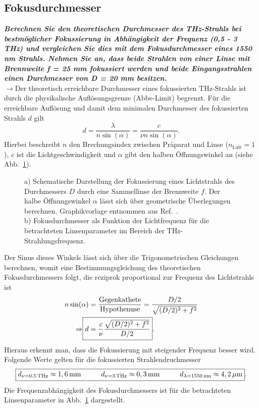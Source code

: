 \subsection{\label{subsec:FZV3}Fokusdurchmesser}
\textbf{\textit{Berechnen Sie den theoretischen Durchmesser des THz-Strahls bei bestmöglicher
Fokussierung in Abhängigkeit der Frequenz (0,5 - 3 THz) und vergleichen Sie dies
mit dem Fokusdurchmesser eines 1550 nm Strahls. Nehmen Sie an, dass beide
Strahlen von einer Linse mit Brennweite f = 25 mm fokussiert werden und beide
Eingangsstrahlen einen Durchmesser von D = 20 mm besitzen.}}\\
$\rightarrow$Der theoretisch erreichbare Durchmesser eines fokussierten THz-Strahls ist durch 
die physikalische Auflösungsgrenze (Abbe-Limit) begrenzt. Für die erreichbare 
Auflösung und damit dem minimalen Durchmesser des fokussierten Strahls $d$ gilt
\begin{equation}
    d = \frac{\lambda}{n\sin(\alpha)} = \frac{c}{\nu n\sin(\alpha)}.
\end{equation} 
Hierbei beschreibt $n$ den Brechungsindex zwischen Präparat und Linse ($n_{\text{Luft}}=1$), $c$ ist die Lichtgeschwindigkeit und 
$\alpha$ gibt den halben Öffnungswinkel an (siehe Abb.~\ref{fig:abbe}). 
\begin{figure}[h!]
    \centering
    \qquad
    \caption{\label{fig:abbe}a) Schematische Darstellung der Fokussierung eines Lichtstrahls des Durchmessers $D$
    durch eine Sammellinse der Brennweite $f$. Der halbe Öffnungswinkel $\alpha$ lässt sich 
    über geometrische Überlegungen berechnen. Graphikvorlage entnommen aus Ref.~\cite{Bild1}. \\
    b) Fokusdurchmesser als Funktion der Lichtfrequenz für die betrachteten Linsenparameter im 
    Bereich der THz-Strahlungsfrequenz.}
\end{figure}\FloatBarrier
Der Sinus dieses Winkels lässt sich über die Trigonometrischen Gleichungen berechnen, womit 
eine Bestimmungsgleichung des theoretischen Fokusdurchmessers folgt, die reziprok proportional zur 
Frequenz des Lichtstrahls ist
\begin{align}
    n\sin(\alpha) &= \frac{\text{Gegenkathete}}{\text{Hypothenuse}} = \frac{D/2}{\sqrt{(D/2)^{2} + f^{2}}} \\
    \Rightarrow\Aboxed{d &= \frac{c}{\nu}\frac{\sqrt{(D/2)^{2} + f^{2}}}{D/2}}.
\end{align}
Hieraus erkennt man, dass die Fokussierung mit steigender Frequenz besser wird.
Folgende Werte gelten für die fokussierten Strahlendruchmesser
\begin{equation}
    \fbox{$d_{\nu=0,5\,\si{THz}} \approx 1,6\,\si{mm}\hspace{1cm}d_{\nu=3\,\si{THz}} \approx 0,3\,\si{mm}
    \hspace{1cm}d_{\lambda=1550\,\si{nm}} \approx 4,2\,\si{\mu m}$}.
\end{equation}
Die Frequenzabhängigkeit des Fokusdurchmessers ist für die betrachteten Linsenparameter in Abb.~\ref{fig:abbe}
dargestellt.
